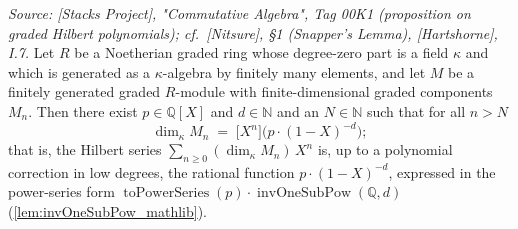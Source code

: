 \begin{lemma}
  \label{lem:gradedHilbertSerre_rational}
  \textit{Source: [Stacks Project], "Commutative Algebra", Tag 00K1
  (proposition on graded Hilbert polynomials); cf.\ [Nitsure], \S 1 (Snapper's
  Lemma), [Hartshorne], I.7.}
  Let \(R\) be a Noetherian graded ring whose degree-zero part is a field
  \(\kappa\) and which is generated as a \(\kappa\)-algebra by finitely many
  elements, and let \(M\) be a finitely generated graded \(R\)-module with
  finite-dimensional graded components \(M_n\). Then there exist
  \(p \in \mathbb{Q}[X]\) and \(d \in \mathbb{N}\) and an \(N \in \mathbb{N}\)
  such that for all \(n > N\)
  \[
    \dim_{\kappa} M_n \;=\; \bigl[ X^n \bigr]\bigl( p \cdot (1 - X)^{-d}\bigr);
  \]
  that is, the Hilbert series \(\sum_{n \ge 0} (\dim_\kappa M_n)\, X^n\) is, up to
  a polynomial correction in low degrees, the rational function
  \(p \cdot (1 - X)^{-d}\), expressed in the power-series form
  \(\operatorname{toPowerSeries}(p) \cdot \operatorname{invOneSubPow}(\mathbb{Q}, d)\)
  (\cref{lem:invOneSubPow_mathlib}).


\end{lemma}
